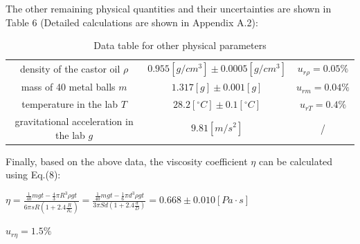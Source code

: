 \documentclass[a4paper,12pt]{article}
\begin{document}
\par The other remaining physical quantities and their uncertainties are shown in Table 6 (Detailed calculations are shown in Appendix A.2):

\begin{table}[h]
\begin{center}
\begin{tabular}{|c||c|c|}
\hline
density of the castor oil $\rho$ & $0.955 [g/cm^3] \pm 0.0005 [g/cm^3]$ & $u_{r\rho} = 0.05\%$ \\
mass of 40 metal balls $m$& $1.317 [g] \pm 0.001 [g]$ & $u_{rm} = 0.04\%$ \\
temperature in the lab $T$ & $28.2[^{\circ}C] \pm 0.1 [^{\circ}C]$ & $u_{rT} = 0.4\%$ \\
gravitational acceleration in the lab $g$ & $9.81 [m/s^2]$ & /\\
\hline
\end{tabular}
\caption{Data table for other physical parameters}
\end{center}
\end{table}

\par Finally, based on the above data, the viscosity coefficient $\eta$ can be calculated using Eq.(8):
\begin{center}
$\displaystyle \eta = \frac{\frac{1}{40}mgt-\frac{4}{3}\pi R^3\rho gt}{6\pi sR(1+2.4\frac{R}{R_c})} = \frac{\frac{1}{40}mgt-\frac{1}{6}\pi d^3\rho gt}{3\pi Sd(1+2.4\frac{d}{D})} = 0.668 \pm 0.010[Pa \cdot s]$
\end{center}
\begin{center}
$u_{r\eta} = 1.5 \%$
\end{center}

\newpage
\end{document}

